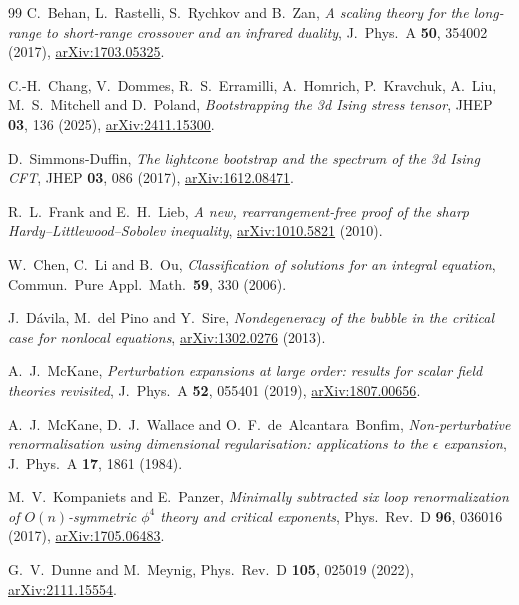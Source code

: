 \begin{thebibliography}{99}
C.~Behan, L.~Rastelli, S.~Rychkov and B.~Zan,
\emph{A scaling theory for the long-range to short-range crossover and an infrared duality},
J.\ Phys.\ A \textbf{50}, 354002 (2017),
\href{https://arxiv.org/abs/1703.05325}{arXiv:1703.05325}.

C.-H.~Chang, V.~Dommes, R.~S.~Erramilli, A.~Homrich, P.~Kravchuk, A.~Liu, M.~S.~Mitchell and
D.~Poland, \emph{Bootstrapping the 3d Ising stress tensor},
JHEP \textbf{03}, 136 (2025),
\href{https://arxiv.org/abs/2411.15300}{arXiv:2411.15300}.

D.~Simmons-Duffin,
\emph{The lightcone bootstrap and the spectrum of the 3d Ising CFT},
JHEP \textbf{03}, 086 (2017),
\href{https://arxiv.org/abs/1612.08471}{arXiv:1612.08471}.

R.~L.~Frank and E.~H.~Lieb,
\emph{A new, rearrangement-free proof of the sharp Hardy--Littlewood--Sobolev inequality},
\href{https://arxiv.org/abs/1010.5821}{arXiv:1010.5821} (2010).

W.~Chen, C.~Li and B.~Ou,
\emph{Classification of solutions for an integral equation},
Commun.\ Pure Appl.\ Math.\ \textbf{59}, 330 (2006).

J.~D\'avila, M.~del Pino and Y.~Sire,
\emph{Nondegeneracy of the bubble in the critical case for nonlocal equations},
\href{https://arxiv.org/abs/1302.0276}{arXiv:1302.0276} (2013).

A.~J.~McKane,
\emph{Perturbation expansions at large order: results for scalar field theories revisited},
J.\ Phys.\ A \textbf{52}, 055401 (2019),
\href{https://arxiv.org/abs/1807.00656}{arXiv:1807.00656}.

A.~J.~McKane, D.~J.~Wallace and O.~F.~de~Alcantara~Bonfim,
\emph{Non-perturbative renormalisation using dimensional regularisation: applications to the
$\epsilon$ expansion}, J.\ Phys.\ A \textbf{17}, 1861 (1984).

M.~V.~Kompaniets and E.~Panzer,
\emph{Minimally subtracted six loop renormalization of $O(n)$-symmetric $\phi^4$ theory and
critical exponents}, Phys.\ Rev.\ D \textbf{96}, 036016 (2017),
\href{https://arxiv.org/abs/1705.06483}{arXiv:1705.06483}.

G.~V.~Dunne and M.~Meynig,
Phys.\ Rev.\ D \textbf{105}, 025019 (2022),
\href{https://arxiv.org/abs/2111.15554}{arXiv:2111.15554}.


\end{thebibliography}
